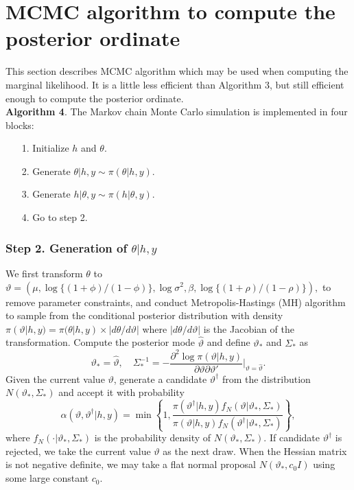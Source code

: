 \section{MCMC algorithm to compute the posterior ordinate}
\label{appendix:posterior ordinate}
This section describes MCMC algorithm which may be used when computing the marginal likelihood. It is a little less efficient than Algorithm 3, but still efficient enough to compute the posterior ordinate.\\

\noindent
{\bf Algorithm 4}.
The Markov chain Monte Carlo simulation is implemented in four blocks:

\begin{itemize}
    \item[1.] Initialize $h$ and $\theta$.
    \item[2.] Generate $\theta|h, y \sim \pi(\theta|h, y)$.
    \item[3.] Generate $h|\theta, y \sim \pi(h|\theta, y)$.
    \item[4.] Go to step 2.
\end{itemize}
\subsubsection*{Step 2. Generation of $\theta|h,y$}
We first transform $\theta$ to $\vartheta = (\mu, \log\{ (1+\phi)/(1-\phi) \}, \log \sigma^2, \beta, \log\{ (1+\rho)/(1-\rho) \}), $ to remove parameter constraints, and conduct Metropolis-Hastings (MH) algorithm to sample from the conditional posterior distribution with density $\pi(\vartheta|h, y) = \pi(\theta|h, y) \times |d\theta / d\vartheta|$ where $|d\theta / d\vartheta|$ is the Jacobian of the transformation. 
Compute the posterior mode $\hat{\vartheta}$ and define $\vartheta_*$ and $\Sigma_*$ as
\begin{equation*}
    \vartheta_* = \hat{\vartheta}, \quad
    \Sigma_*^{-1} = -\frac{\partial^2 \log \pi(\vartheta|h, y)}{\partial \vartheta \partial \vartheta'} \bigg|_{\vartheta = \hat{\vartheta}}.
\end{equation*}
Given the current value $\vartheta$, generate a candidate $\vartheta^\dag$ from the distribution $N(\vartheta_*, \Sigma_*)$ and accept it with probability
\begin{equation*}
    \alpha(\vartheta, \vartheta^\dag|h, y) = \min \left\{1, \frac{\pi(\vartheta^\dag|h, y) f_N(\vartheta|\vartheta_*, \Sigma_*)}{\pi(\vartheta|h, y) f_N(\vartheta^\dag|\vartheta_*, \Sigma_*)} \right\},
\end{equation*}
where $f_N(\cdot|\vartheta_*, \Sigma_*)$ is the probability density of $N(\vartheta_*, \Sigma_*)$.
If candidate $\vartheta^\dag$ is rejected, we take the current value $\vartheta$ as the next draw. When the Hessian matrix is not negative definite, we may take a flat normal proposal $N(\vartheta_*, c_0 I)$ using some large constant $c_0$.
